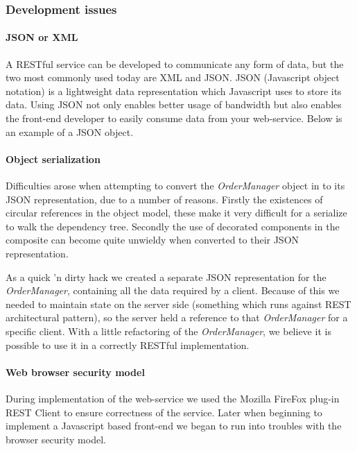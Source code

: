 \documentclass[pdftex,11pt,a4paper]{article}
\begin{document}
\subsubsection{Development issues}

\paragraph{JSON or XML}
A RESTful service can be developed to communicate any form of data, but the two most commonly used today are XML and JSON. JSON (Javascript object notation) is a lightweight data representation which Javascript uses to store its data. Using JSON not only enables better usage of bandwidth but also enables the front-end developer to easily consume data from your web-service. Below is an example of a JSON object.



\paragraph{Object serialization}
Difficulties arose when attempting to convert the \emph{OrderManager} object in to its JSON representation, due to a number of reasons. Firstly the existences of circular references in the object model, these make it very difficult for a serialize to walk the dependency tree. Secondly the use of decorated components in the composite can become quite unwieldy when converted to their JSON representation.

As a quick ’n dirty hack we created a separate JSON representation for the \emph{OrderManager}, containing all the data required by a client. Because of this we needed to maintain state on the server side (something which runs against REST architectural pattern), so the server held a reference to that \emph{OrderManager} for a specific client.
With a little refactoring of the \emph{OrderManager}, we believe it is possible to use it in a correctly RESTful implementation.

\paragraph{Web browser security model}
During implementation of the web-service we used the Mozilla FireFox plug-in REST Client\cite{website:restClient} to ensure correctness of the service. Later when beginning to implement a Javascript based front-end we began to run into troubles with the browser security model.
\end{document}
